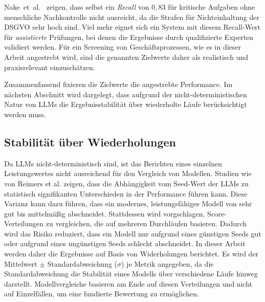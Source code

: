 Nake~et~al.\ \cite{nake2023towards} zeigen, dass selbst ein \emph{Recall} von $0{,}83$ für kritische Aufgaben ohne menschliche Nachkontrolle nicht ausreicht, da die Strafen für Nichteinhaltung der \ac{DSGVO} sehr hoch sind. Viel mehr eignet sich ein System mit diesem Recall-Wert für \emph{assistierte} Prüfungen, bei denen die Ergebnisse durch qualifizierte Experten validiert werden. Für ein Screening von Geschäftsprozessen, wie es in dieser Arbeit angestrebt wird, sind die genannten Zielwerte daher als realistisch und praxisrelevant einzuschätzen.

Zusammenfassend fixieren die Zielwerte die angestrebte Performance. Im nächsten Abschnitt wird dargelegt, dass aufgrund der nicht-deterministischen Natur von \acp{LLM} die Ergebnisstabilität über wiederholte Läufe berücksichtigt werden muss.

\subsection*{Stabilität über Wiederholungen}

Da \acp{LLM} nicht-deterministisch sind, ist das Berichten eines einzelnen Leistungswertes nicht ausreichend für den Vergleich von Modellen. Studien wie von Reimers et al. \cite{reimers2017reporting} zeigen, dass die Abhängigkeit vom Seed-Wert der \acp{LLM} zu statistisch signifikanten Unterschieden in der Performance führen kann. Diese Varianz kann dazu führen, dass ein modernes, leistungsfähiges Modell von sehr gut bis mittelmäßig abschneidet. Stattdessen wird vorgschlagen, Score-Verteilungen zu vergleichen, die auf mehreren Durchläufen basieren. Dadurch wird das Risiko reduziert, dass ein Modell nur aufgrund eines günstigen Seeds gut oder aufgrund eines ungünstigen Seeds schlecht abschneidet. In dieser Arbeit werden daher die Ergebnisse auf Basis von Widerholungen berichtet. Es wird der Mittelwert $\pm$ Standardabweichung ($\sigma$) je Metrik angegeben, da die Standardabweichung die Stabilität eines Modells über verschiedene Läufe hinweg darstellt. Modellvergleiche basieren am Ende auf diesen Verteilungen und nicht auf Einzelfällen, um eine fundierte Bewertung zu ermöglichen.